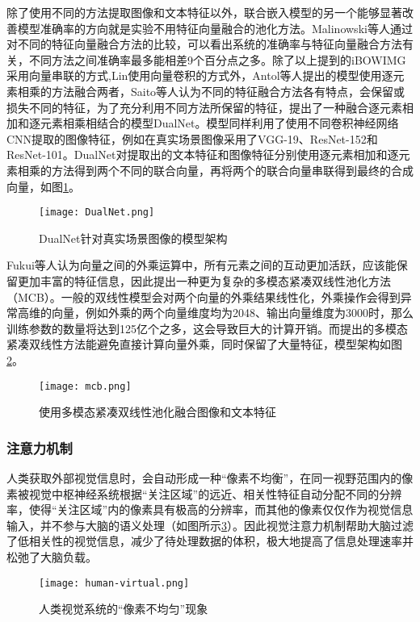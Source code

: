 除了使用不同的方法提取图像和文本特征以外，联合嵌入模型的另一个能够显著改善模型准确率的方向就是实验不用特征向量融合的池化方法。Malinowski等人通过对不同的特征向量融合方法的比较，可以看出系统的准确率与特征向量融合方法有关，不同方法之间准确率最多能相差9个百分点之多。除了以上提到的iBOWIMG采用向量串联的方式,Lin使用向量卷积的方式外，Antol等人提出的模型使用逐元素相乘的方法融合两者，Saito等人认为不同的特征融合方法各有特点，会保留或损失不同的特征，为了充分利用不同方法所保留的特征，提出了一种融合逐元素相加和逐元素相乘相结合的模型DualNet。模型同样利用了使用不同卷积神经网络CNN提取的图像特征，例如在真实场景图像采用了VGG-19、ResNet-152和ResNet-101。DualNet对提取出的文本特征和图像特征分别使用逐元素相加和逐元素相乘的方法得到两个不同的联合向量，再将两个的联合向量串联得到最终的合成向量，如图\ref{DualNet}。
\begin{figure}[H]
	\centering
	\texttt{[image: DualNet.png]}
	\caption{DualNet针对真实场景图像的模型架构}
	\label{DualNet}
\end{figure}

Fukui等人认为向量之间的外乘运算中，所有元素之间的互动更加活跃，应该能保留更加丰富的特征信息，因此提出一种更为复杂的多模态紧凑双线性池化方法（MCB）。一般的双线性模型会对两个向量的外乘结果线性化，外乘操作会得到异常高维的向量，例如外乘的两个向量维度均为2048、输出向量维度为3000时，那么训练参数的数量将达到125亿个之多，这会导致巨大的计算开销。而提出的多模态紧凑双线性方法能避免直接计算向量外乘，同时保留了大量特征，模型架构如图\ref{mcb}。
\begin{figure}[H]
	\centering
	\texttt{[image: mcb.png]}
	\caption{使用多模态紧凑双线性池化融合图像和文本特征}
	\label{mcb}
\end{figure}

\subsubsection{注意力机制}
人类获取外部视觉信息时，会自动形成一种“像素不均衡”，在同一视野范围内的像素被视觉中枢神经系统根据“关注区域”的远近、相关性特征自动分配不同的分辨率，使得“关注区域”内的像素具有极高的分辨率，而其他的像素仅仅作为视觉信息输入，并不参与大脑的语义处理（如图所示\ref{human-virtual}）。因此视觉注意力机制帮助大脑过滤了低相关性的视觉信息，减少了待处理数据的体积，极大地提高了信息处理速率并松弛了大脑负载。
\begin{figure}[H]
	\centering
	\texttt{[image: human-virtual.png]}
	\caption{人类视觉系统的“像素不均匀”现象}
	\label{human-virtual}
\end{figure}

